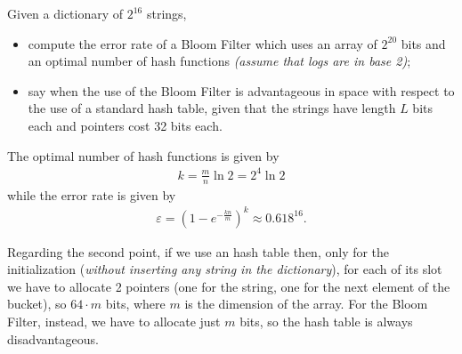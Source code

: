 \exercise

Given a dictionary of $2^{16}$ strings,
%
\begin{itemize}

  \item compute the error rate of a Bloom Filter which uses an array of $2^{20}$
  bits and an optimal number of hash functions \emph{(assume that logs are in
  base 2)};

  \item say when the use of the Bloom Filter is advantageous in space with
  respect to the use of a standard hash table, given that the strings have
  length $L$ bits each and pointers cost 32 bits each.

\end{itemize}

\solution

The optimal number of hash functions is given by
%
\begin{align*}
  k = \frac{m}{n}\ln 2 = 2^4 \ln 2
\end{align*}
%
while the error rate is given by
%
\begin{align*}
  \varepsilon = \left( 1 - e^{-\frac{kn}{m}}\right)^k \approx 0.618^{16}.
\end{align*}

Regarding the second point, if we use an hash table then, only for the
initialization (\emph{without inserting any string in the dictionary}), for each
of its slot we have to allocate 2 pointers (one for the string, one for the next
element of the bucket), so $64 \cdot m$ bits, where $m$ is the dimension of the
array. For the Bloom Filter, instead, we have to allocate just $m$ bits, so
the hash table is always disadvantageous.
